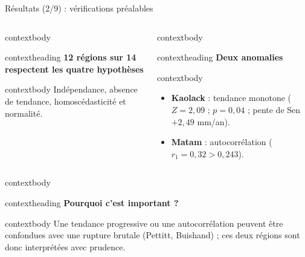 \documentclass[aspectratio=169,11pt]{beamer}
\begin{document}
\begin{frame}{Résultats (2/9) : vérifications préalables}
  \small
  \begin{columns}[T,onlytextwidth]
      \begin{beamercolorbox}[wd=\linewidth,rounded=true,sep=0pt]{contextbody}
        \begin{beamercolorbox}[wd=\linewidth,sep=0.09cm]{contextheading}
          \bfseries 12 régions sur 14 respectent les quatre hypothèses
        \end{beamercolorbox}
        \begin{beamercolorbox}[wd=\linewidth,sep=0.10cm]{contextbody}
          \footnotesize
          Indépendance, absence de tendance, homoscédasticité et normalité.
        \end{beamercolorbox}
      \end{beamercolorbox}
      \begin{beamercolorbox}[wd=\linewidth,rounded=true,sep=0pt]{contextbody}
        \begin{beamercolorbox}[wd=\linewidth,sep=0.09cm]{contextheading}
          {\color{marine}\bfseries Deux anomalies}
        \end{beamercolorbox}
        \begin{beamercolorbox}[wd=\linewidth,sep=0.08cm]{contextbody}
          \footnotesize
          \begin{itemize}
            \setlength\itemsep{0.04cm}
            \item \textbf{Kaolack} : tendance monotone ($Z=2{,}09$ ; $p=0{,}04$ ; pente de Sen $+2{,}49$ mm/an).
            \item \textbf{Matam} : autocorrélation ($r_1=0{,}32>0{,}243$).
          \end{itemize}
        \end{beamercolorbox}
      \end{beamercolorbox}
  \end{columns}
  \vspace{0.20cm}
  \begin{beamercolorbox}[wd=\textwidth,rounded=true,sep=0pt]{contextbody}
    \begin{beamercolorbox}[wd=\linewidth,sep=0.08cm]{contextheading}
      \bfseries Pourquoi c’est important ?
    \end{beamercolorbox}
    \begin{beamercolorbox}[wd=\linewidth,sep=0.10cm]{contextbody}
      \footnotesize
      Une tendance progressive ou une autocorrélation peuvent être confondues avec une rupture brutale (Pettitt, Buishand) ; ces deux régions sont donc interprétées avec prudence.
    \end{beamercolorbox}
  \end{beamercolorbox}
\end{frame}
\end{document}
